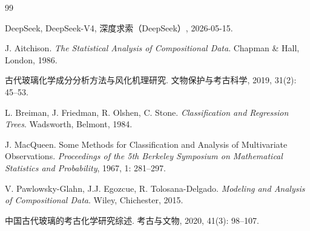 \begin{thebibliography}{99}

DeepSeek, DeepSeek-V4, 深度求索（DeepSeek）, 2026-05-15.

J. Aitchison. \textit{The Statistical Analysis of Compositional Data}. Chapman \& Hall, London, 1986.

古代玻璃化学成分分析方法与风化机理研究. 文物保护与考古科学, 2019, 31(2): 45--53.

L. Breiman, J. Friedman, R. Olshen, C. Stone. \textit{Classification and Regression Trees}. Wadsworth, Belmont, 1984.

J. MacQueen. Some Methods for Classification and Analysis of Multivariate Observations. \textit{Proceedings of the 5th Berkeley Symposium on Mathematical Statistics and Probability}, 1967, 1: 281--297.

V. Pawlowsky-Glahn, J.J. Egozcue, R. Tolosana-Delgado. \textit{Modeling and Analysis of Compositional Data}. Wiley, Chichester, 2015.

中国古代玻璃的考古化学研究综述. 考古与文物, 2020, 41(3): 98--107.

\end{thebibliography}
